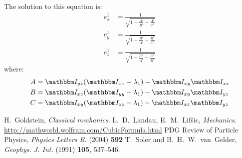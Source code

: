 \documentclass[a4paper,11pt]{article}
\newcommand{\itm}{\mathbbm I}
\newcommand{\itc}[1]{\itm_{#1}}
\begin{document}
The solution to this equation is:
\begin{align}
e^1_x &= \frac{1}{\sqrt{1 + \frac{A^2}{B^2} + \frac{A^2}{C^2}}}\\
e^1_y &= \frac{1}{\sqrt{1 + \frac{B^2}{A^2} + \frac{B^2}{C^2}}}\\
e^1_z &= \frac{1}{\sqrt{1 + \frac{C^2}{A^2} + \frac{C^2}{B^2}}}
\end{align}
where:
\begin{align}
A &= \itc{yz}(\itc{xx} - \lambda_1) - \itc{xy}\itc{xz}\\
B &= \itc{xz}(\itc{yy} - \lambda_1) - \itc{xy}\itc{yz}\\
C &= \itc{xy}(\itc{zz} - \lambda_1) - \itc{xz}\itc{yz}
\end{align}



\begin{thebibliography}{100}
H.~Goldstein, \emph{Classical mechanics}.
L.~D.~Landau, E.~M.~Lif\^sic, \emph{Mechanics}.
\url{http://mathworld.wolfram.com/CubicFormula.html}
PDG Review of Particle Physics,
  \emph{Physics Letters B.} (2004) {\bf 592}
T.~Soler and B.~H.~W.~van~Gelder,
  \emph{Geophys. J. Int.} (1991) {\bf 105}, 537--546.
\end{thebibliography}
\end{document}
